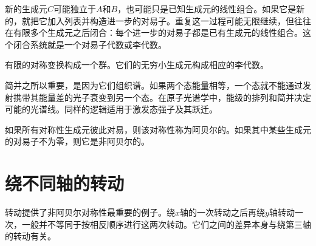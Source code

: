 新的生成元\(C\)可能独立于\(A\)和\(B\)，也可能只是已知生成元的线性组合。如果它是新的，就把它加入列表并构造进一步的对易子。重复这一过程可能无限继续，但往往在有限多个生成元之后闭合：每个进一步的对易子都是已有生成元的线性组合。这个闭合系统就是一个对易子代数或李代数。

有限的对称变换构成一个群。它们的无穷小生成元构成相应的李代数。

简并之所以重要，是因为它们组织谱。如果两个态能量相等，一个态就不能通过发射携带其能量差的光子衰变到另一个态。在原子光谱学中，能级的排列和简并决定可能的光谱线。同样的逻辑适用于激发态强子及其跃迁。

\begin{classroomqa}
\end{classroomqa}

如果所有对称性生成元彼此对易，则该对称性称为阿贝尔的。如果其中某些生成元的对易子不为零，则它是非阿贝尔的。

\begin{classroomqa}
\end{classroomqa}

\begin{classroomqa}
\end{classroomqa}

\section{绕不同轴的转动}

转动提供了非阿贝尔对称性最重要的例子。绕\(x\)轴的一次转动之后再绕\(y\)轴转动一次，一般并不等同于按相反顺序进行这两次转动。它们之间的差异本身与绕第三轴的转动有关。

\begin{classroomqa}
\end{classroomqa}

